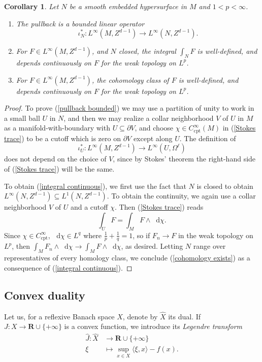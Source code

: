 \documentclass[reqno,11pt]{amsart}
\newcommand{\RR}{\mathbf{R}}
\newcommand*\dif{\mathop{}\!\mathrm{d}}
\newcommand{\dfn}[1]{\emph{#1}\index{#1}}
\newcommand{\cpt}{\mathrm{cpt}}
\newtheorem{corollary}[theorem]{Corollary}
\theoremstyle{definition}
\numberwithin{equation}{section}
\begin{document}
\begin{corollary}\label{trace on cycles}
Let $N$ be a smooth embedded hypersurface in $M$ and $1 < p < \infty$.
\begin{enumerate}
\item \label{pullback bounded} The pullback is a bounded linear operator
$$\iota^*_N: L^\infty(M, Z^{d - 1}) \to L^\infty(N, Z^{d - 1}).$$
\item \label{integral continuous} For $F \in L^\infty(M, Z^{d - 1})$, and $N$ closed, the integral $\int_N F$ is well-defined, and depends continuously on $F$ for the weak topology on $L^p$.
\item \label{cohomology exists} For $F \in L^\infty(M, Z^{d - 1})$, the cohomology class of $F$ is well-defined, and depends continuously on $F$ for the weak topology on $L^p$.
\end{enumerate}
\end{corollary}
\begin{proof}
To prove (\ref{pullback bounded}) we may use a partition of unity to work in a small ball $U$ in $N$, and then we may realize a collar neighborhood $V$ of $U$ in $M$ as a manifold-with-boundary with $U \subseteq \partial V$, and choose $\chi \in C^\infty_\cpt(M)$ in (\ref{Stokes trace}) to be a cutoff which is zero on $\partial V$ except along $U$.
The definition of
$$\iota^*_U: L^\infty(M, Z^{d - 1}) \to L^\infty(U, \Omega^\ell)$$
does not depend on the choice of $V$, since by Stokes' theorem the right-hand side of (\ref{Stokes trace}) will be the same.

To obtain (\ref{integral continuous}), we first use the fact that $N$ is closed to obtain $L^\infty(N, Z^{d - 1}) \subseteq L^1(N, Z^{d - 1})$.
To obtain the continuity, we again use a collar neighborhood $V$ of $U$ and a cutoff $\chi$.
Then (\ref{Stokes trace}) reads 
$$\int_U F = \int_M F \wedge \dif \chi.$$
Since $\chi \in C^\infty_\cpt$, $\dif \chi \in L^q$ where $\frac{1}{p} + \frac{1}{q} = 1$, so if $F_n \to F$ in the weak topology on $L^p$, then $\int_M F_n \wedge \dif \chi \to \int_M F \wedge \dif \chi$, as desired.
Letting $N$ range over representatives of every homology class, we conclude (\ref{cohomology exists}) as a consequence of (\ref{integral continuous}).
\end{proof}

\subsection{Convex duality}
Let us, for a reflexive Banach space $X$, denote by $\hat X$ its dual.
If $J: X \to \RR \cup \{+\infty\}$ is a convex function, we introduce its \dfn{Legendre transform}
\begin{align*}
	\hat J: \hat X &\to \RR \cup \{+\infty\}\\
	\xi &\mapsto \sup_{x \in X} \langle \xi, x\rangle - f(x).
\end{align*}
\end{document}
